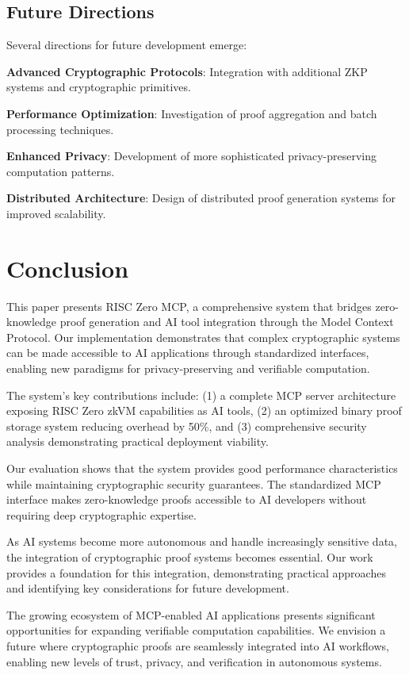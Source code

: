 \documentclass[11pt]{article}
\begin{document}
\subsection{Future Directions}

Several directions for future development emerge:

\textbf{Advanced Cryptographic Protocols}: Integration with additional ZKP systems and cryptographic primitives.

\textbf{Performance Optimization}: Investigation of proof aggregation and batch processing techniques.

\textbf{Enhanced Privacy}: Development of more sophisticated privacy-preserving computation patterns.

\textbf{Distributed Architecture}: Design of distributed proof generation systems for improved scalability.

\section{Conclusion}
\label{sec:conclusion}

This paper presents RISC Zero MCP, a comprehensive system that bridges zero-knowledge proof generation and AI tool integration through the Model Context Protocol. Our implementation demonstrates that complex cryptographic systems can be made accessible to AI applications through standardized interfaces, enabling new paradigms for privacy-preserving and verifiable computation.

The system's key contributions include: (1) a complete MCP server architecture exposing RISC Zero zkVM capabilities as AI tools, (2) an optimized binary proof storage system reducing overhead by 50\%, and (3) comprehensive security analysis demonstrating practical deployment viability.

Our evaluation shows that the system provides good performance characteristics while maintaining cryptographic security guarantees. The standardized MCP interface makes zero-knowledge proofs accessible to AI developers without requiring deep cryptographic expertise.

As AI systems become more autonomous and handle increasingly sensitive data, the integration of cryptographic proof systems becomes essential. Our work provides a foundation for this integration, demonstrating practical approaches and identifying key considerations for future development.

The growing ecosystem of MCP-enabled AI applications presents significant opportunities for expanding verifiable computation capabilities. We envision a future where cryptographic proofs are seamlessly integrated into AI workflows, enabling new levels of trust, privacy, and verification in autonomous systems.
\end{document}
